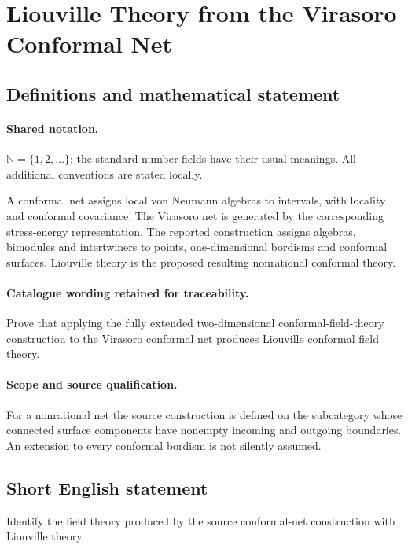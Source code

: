 \documentclass[11pt]{article}
\begin{document}
\section{Liouville Theory from the Virasoro Conformal Net}\label{statement}

\subsection{Definitions and mathematical statement}

\paragraph{Shared notation.}$\mathbb N=\{1,2,\ldots\}$; the standard number fields have their usual meanings. All additional conventions are stated locally.


A conformal net assigns local von Neumann algebras to intervals, with locality and conformal covariance. The Virasoro net is generated by the corresponding stress-energy representation. The reported construction assigns algebras, bimodules and intertwiners to points, one-dimensional bordisms and conformal surfaces. Liouville theory is the proposed resulting nonrational conformal theory.

\paragraph{Catalogue wording retained for traceability.}
Prove that applying the fully extended two-dimensional conformal-field-theory construction to the Virasoro conformal net produces Liouville conformal field theory.

\paragraph{Scope and source qualification.}For a nonrational net the source construction is defined on the subcategory whose connected surface components have nonempty incoming and outgoing boundaries. An extension to every conformal bordism is not silently assumed.
\subsection{Short English statement}
Identify the field theory produced by the source conformal-net construction with Liouville theory.
\end{document}
